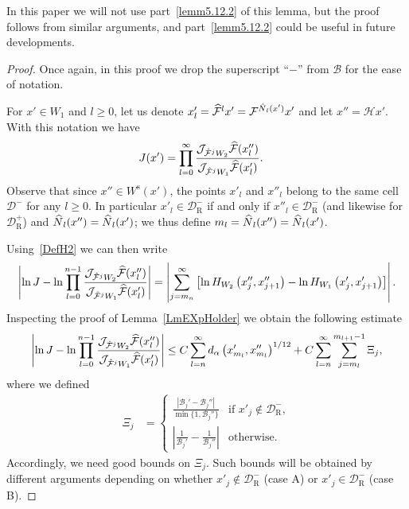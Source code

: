 \documentclass[AHL, Unicode, longabstracts,published]{cedram}
\newcommand{\nin}{\not\in}
\newcommand{\stable}{\text{s}}
\newcommand{\cB}{\mathcal{B}}
\newcommand{\pslope}{\mathcal{B}}
\newcommand{\cm}{\mathcal{F}}
\newcommand{\cell}{\mathcal{D}}
\newcommand{\hol}{\mathcal{H}}
\newcommand{\cmp}{\hat\cm}
\newcommand{\recoPrivate}{\mathrm{R}}
\newcommand{\reco}{{\cell^-_{\recoPrivate}}}
\newcommand{\backReco}{{\cell^+_{\recoPrivate}}}
\newcommand{\Ws}{W^{\stable}}
\newcommand{\ppPrivate}[2]{#1^{#2}}
\newcommand{\prePrivate}[1]{\ppPrivate{#1}{-}}
\newcommand{\prpslope}{\prePrivate{\pslope}}
\newcommand{\Np}{\hat N}
\newcommand{\jac}[1]{\mathcal{J}_{#1}}
\renewcommand{\prpslope}{\cB}
\renewcommand{\prpslope}{\cB}
\renewcommand{\prpslope}{\cB}
\newcommand{\slopeDifference}{\Xi}
\let\oldhat\hat
\renewcommand*{\hat}[1]{\mathchoice{\widehat{#1}}{\widehat{#1}}{\oldhat{#1}}{\oldhat{#1}}}
\begin{document}
\begin{rema}
In this paper we will not use part~\eqref{lemm5.12.2} of this lemma, but the proof follows from similar arguments, and part~\eqref{lemm5.12.2} could be useful in future developments.
\end{rema}
\begin{proof}
Once again, in this proof we drop the superscript ``$-$'' from $\cB$ for the ease of notation.


For $x'\in W_1$ and $l\ge0$, let us denote $x'_l = \cmp^l x'=\cm^{\Np_{l}(x')} x'$ and let $x''=\hol x'$. With this notation we have
\begin{align*}
J(x') &=\prod_{l = 0}^{\infty}
\frac{\jac{\cmp^{j}W_{2}}\cmp(x_l'')}{\jac{\cmp^{j}W_{1}}\cmp(x'_l)}.
\end{align*}
Observe that since $x''\in \Ws(x')$, the points $x'_l$ and $x''_l$ belong to the same cell $\cell^{-}$ for any $l \ge0 $. In particular $x'_l\in\reco$ if and only if $x''_l\in\reco$ (and likewise for $\backReco$) and $\Np_{l}(x'') = \Np_{l}(x')$; we thus define $m_{l} = \Np_{l}(x'') = \Np_{l}(x')$.

Using~\eqref{DefH2} we can then write
\begin{align*}
\left|\ln J-\ln \prod_{l=0}^{n-1} \frac{\jac{\cmp^{j}W_{2}}\cmp(x_l'')}{\jac{\cmp^{j}W_{1}}\cmp(x'_l)}\right| =\left|\sum_{j=m_n}^{\infty} \left[\ln H_{W_{2}}\left(x_j'', x_{j+1}''\right)-\ln H_{W_{1}}\left(x_j', x_{j+1}'\right)\right]\right|.
\end{align*}
Inspecting the proof of Lemma~\ref{LmEXpHolder} we obtain the following estimate
\begin{align}\label{UBJak}
\left|\ln J-\ln \prod_{l=0}^{n-1} \frac{\jac{\cmp^{j}W_{2}}\cmp(x_l'')}{\jac{\cmp^{j}W_{1}}\cmp(x'_l)}\right|
\leq C \sum_{l=n}^{\infty} d_\alpha\left(x_{m_l}', x_{m_l}''\right)^{1/12}+ C \sum_{l=n}^{\infty} \sum_{j=m_l}^{m_{l+1}-1} \slopeDifference_j,
\end{align}
where we defined
\begin{align*}
\slopeDifference_j &=
\begin{cases}
\displaystyle
\frac{|\prpslope_j'-\prpslope_j''|}{\min\{1,\prpslope_j''\}} &\text{if }x'_j\nin\reco, \\[5pt]
\displaystyle
\left|\frac{1}{\prpslope_j'}-\frac{1}{\prpslope_j''}\right| &\text{otherwise}.
\end{cases}
\end{align*}
Accordingly, we need good bounds on $\slopeDifference_j$. Such bounds will be obtained by different arguments depending on whether $x'_{j}\nin\reco$ (case A) or $x'_{j}\in\reco$ (case B).



\end{proof}
\end{document}
